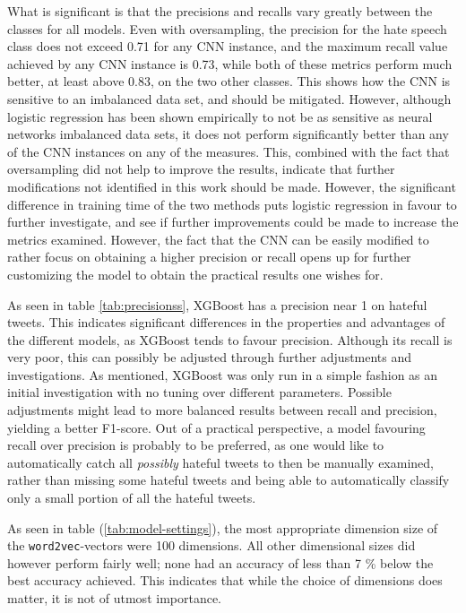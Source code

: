 \documentclass[twocolumn]{article}
\begin{document}
What is significant is that the precisions and recalls vary greatly between the classes for all models. Even with oversampling, the precision for the hate speech class does not exceed 0.71 for any CNN instance, and the maximum recall value achieved by any CNN instance is 0.73, while both of these metrics perform much better, at least above 0.83, on the two other classes. This shows how the CNN is sensitive to an imbalanced data set, and should be mitigated. However, although logistic regression has been shown empirically to not be as sensitive as neural networks imbalanced data sets, it does not perform significantly better than any of the CNN instances on any of the measures. This, combined with the fact that oversampling did not help to improve the results, indicate that further modifications not identified in this work should be made. However, the significant difference in training time of the two methods puts logistic regression in favour to further investigate, and see if further improvements could be made to increase the metrics examined. However, the fact that the CNN can be easily modified to rather focus on obtaining a higher precision or recall opens up for further customizing the model to obtain the practical results one wishes for. 

As seen in table \ref{tab:precisionss}, XGBoost has a precision near 1 on hateful tweets. This indicates significant differences in the properties and advantages of the different models, as XGBoost tends to favour precision. Although its recall is very poor, this can possibly be adjusted through further adjustments and investigations. As mentioned, XGBoost was only run in a simple fashion as an initial investigation with no tuning over different parameters. Possible adjustments might lead to more balanced results between recall and precision, yielding a better F1-score. Out of a practical perspective, a model favouring recall over precision is probably to be preferred, as one would like to automatically catch all \textit{possibly} hateful tweets to then be manually examined, rather than missing some hateful tweets and being able to automatically classify only a small portion of all the hateful tweets. 

As seen in table (\ref{tab:model-settings}), the most appropriate dimension size of the \verb|word2vec|-vectors were 100 dimensions. All other dimensional sizes did however perform fairly well; none had an accuracy of less than 7 \% below the best accuracy achieved. This indicates that while the choice of dimensions does matter, it is not of utmost importance. 
\end{document}
